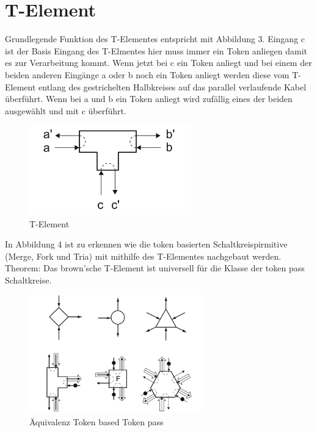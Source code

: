 \documentclass[11pt,a4paper]{article}
\begin{document}
\section{T-Element}
Grundlegende Funktion des T-Elementes entspricht mit Abbildung 3.
%
Eingang c ist der Basis Eingang des T-Elmentes hier muss immer ein Token
anliegen damit es zur Verarbeitung kommt.
%
Wenn jetzt bei c ein Token anliegt und bei einem der beiden anderen
Eingänge a oder b noch ein Token anliegt werden diese vom T-Element 
entlang des gestrichelten Halbkreises auf das parallel verlaufende 
Kabel überführt.
%
Wenn bei a und b ein Token anliegt wird zufällig 
eines der beiden ausgewählt und mit c überführt.

\begin{figure}[h]
    \centering
    \includegraphics[width=7cm]{bilder/T_Element.png}
    \caption{T-Element}
    \label{fig:T_Element}
\end{figure}    

In Abbildung 4 ist zu erkennen wie die token basierten Schaltkreispirmitive 
(Merge, Fork und Tria) mit mithilfe des T-Elementes nachgebaut werden.
%
Theorem: Das brown'sche T-Element ist universell für die Klasse der token pass 
Schaltkreise.

\begin{figure}[h]
    \centering 
    \centering
    \includegraphics[width=7.5cm]{bilder/BasedToPass.png}
    \caption{Äquivalenz Token based Token pass}
    \label{fig:BasedToPass}
\end{figure}
\end{document}
